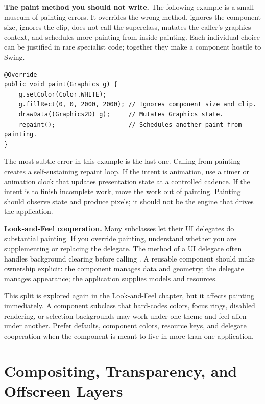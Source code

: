 \textbf{The paint method you should not write.} The following example is a small museum of painting errors. It overrides the wrong method, ignores the component size, ignores the clip, does not call the superclass, mutates the caller's graphics context, and schedules more painting from inside painting. Each individual choice can be justified in rare specialist code; together they make a component hostile to Swing.

\begin{lstlisting}[caption={Do not copy this pattern.}]
@Override
public void paint(Graphics g) {
    g.setColor(Color.WHITE);
    g.fillRect(0, 0, 2000, 2000); // Ignores component size and clip.
    drawData((Graphics2D) g);     // Mutates Graphics state.
    repaint();                    // Schedules another paint from painting.
}
\end{lstlisting}

The most subtle error in this example is the last one. Calling  from painting creates a self-sustaining repaint loop. If the intent is animation, use a timer or animation clock that updates presentation state at a controlled cadence. If the intent is to finish incomplete work, move the work out of painting. Painting should observe state and produce pixels; it should not be the engine that drives the application.

\textbf{Look-and-Feel cooperation.} Many  subclasses let their UI delegates do substantial painting. If you override painting, understand whether you are supplementing or replacing the delegate. The  method of a UI delegate often handles background clearing before calling . A reusable component should make ownership explicit: the component manages data and geometry; the delegate manages appearance; the application supplies models and resources.

This split is explored again in the Look-and-Feel chapter, but it affects painting immediately. A component subclass that hard-codes colors, focus rings, disabled rendering, or selection backgrounds may work under one theme and feel alien under another. Prefer  defaults, component colors, resource keys, and delegate cooperation when the component is meant to live in more than one application.

\section{Compositing, Transparency, and Offscreen Layers}


